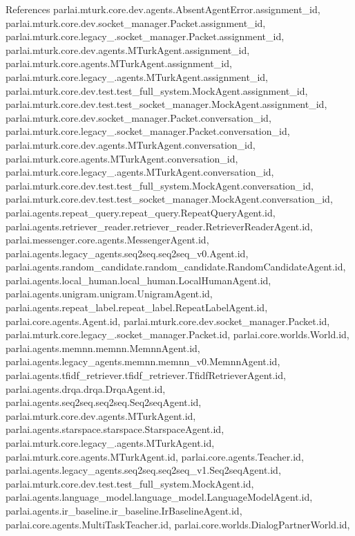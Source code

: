 References parlai.\+mturk.\+core.\+dev.\+agents.\+Absent\+Agent\+Error.\+assignment\+\_\+id, parlai.\+mturk.\+core.\+dev.\+socket\+\_\+manager.\+Packet.\+assignment\+\_\+id, parlai.\+mturk.\+core.\+legacy\+\_.\+socket\+\_\+manager.\+Packet.\+assignment\+\_\+id, parlai.\+mturk.\+core.\+dev.\+agents.\+M\+Turk\+Agent.\+assignment\+\_\+id, parlai.\+mturk.\+core.\+agents.\+M\+Turk\+Agent.\+assignment\+\_\+id, parlai.\+mturk.\+core.\+legacy\+\_.\+agents.\+M\+Turk\+Agent.\+assignment\+\_\+id, parlai.\+mturk.\+core.\+dev.\+test.\+test\+\_\+full\+\_\+system.\+Mock\+Agent.\+assignment\+\_\+id, parlai.\+mturk.\+core.\+dev.\+test.\+test\+\_\+socket\+\_\+manager.\+Mock\+Agent.\+assignment\+\_\+id, parlai.\+mturk.\+core.\+dev.\+socket\+\_\+manager.\+Packet.\+conversation\+\_\+id, parlai.\+mturk.\+core.\+legacy\+\_.\+socket\+\_\+manager.\+Packet.\+conversation\+\_\+id, parlai.\+mturk.\+core.\+dev.\+agents.\+M\+Turk\+Agent.\+conversation\+\_\+id, parlai.\+mturk.\+core.\+agents.\+M\+Turk\+Agent.\+conversation\+\_\+id, parlai.\+mturk.\+core.\+legacy\+\_.\+agents.\+M\+Turk\+Agent.\+conversation\+\_\+id, parlai.\+mturk.\+core.\+dev.\+test.\+test\+\_\+full\+\_\+system.\+Mock\+Agent.\+conversation\+\_\+id, parlai.\+mturk.\+core.\+dev.\+test.\+test\+\_\+socket\+\_\+manager.\+Mock\+Agent.\+conversation\+\_\+id, parlai.\+agents.\+repeat\+\_\+query.\+repeat\+\_\+query.\+Repeat\+Query\+Agent.\+id, parlai.\+agents.\+retriever\+\_\+reader.\+retriever\+\_\+reader.\+Retriever\+Reader\+Agent.\+id, parlai.\+messenger.\+core.\+agents.\+Messenger\+Agent.\+id, parlai.\+agents.\+legacy\+\_\+agents.\+seq2seq.\+seq2seq\+\_\+v0.\+Agent.\+id, parlai.\+agents.\+random\+\_\+candidate.\+random\+\_\+candidate.\+Random\+Candidate\+Agent.\+id, parlai.\+agents.\+local\+\_\+human.\+local\+\_\+human.\+Local\+Human\+Agent.\+id, parlai.\+agents.\+unigram.\+unigram.\+Unigram\+Agent.\+id, parlai.\+agents.\+repeat\+\_\+label.\+repeat\+\_\+label.\+Repeat\+Label\+Agent.\+id, parlai.\+core.\+agents.\+Agent.\+id, parlai.\+mturk.\+core.\+dev.\+socket\+\_\+manager.\+Packet.\+id, parlai.\+mturk.\+core.\+legacy\+\_.\+socket\+\_\+manager.\+Packet.\+id, parlai.\+core.\+worlds.\+World.\+id, parlai.\+agents.\+memnn.\+memnn.\+Memnn\+Agent.\+id, parlai.\+agents.\+legacy\+\_\+agents.\+memnn.\+memnn\+\_\+v0.\+Memnn\+Agent.\+id, parlai.\+agents.\+tfidf\+\_\+retriever.\+tfidf\+\_\+retriever.\+Tfidf\+Retriever\+Agent.\+id, parlai.\+agents.\+drqa.\+drqa.\+Drqa\+Agent.\+id, parlai.\+agents.\+seq2seq.\+seq2seq.\+Seq2seq\+Agent.\+id, parlai.\+mturk.\+core.\+dev.\+agents.\+M\+Turk\+Agent.\+id, parlai.\+agents.\+starspace.\+starspace.\+Starspace\+Agent.\+id, parlai.\+mturk.\+core.\+legacy\+\_.\+agents.\+M\+Turk\+Agent.\+id, parlai.\+mturk.\+core.\+agents.\+M\+Turk\+Agent.\+id, parlai.\+core.\+agents.\+Teacher.\+id, parlai.\+agents.\+legacy\+\_\+agents.\+seq2seq.\+seq2seq\+\_\+v1.\+Seq2seq\+Agent.\+id, parlai.\+mturk.\+core.\+dev.\+test.\+test\+\_\+full\+\_\+system.\+Mock\+Agent.\+id, parlai.\+agents.\+language\+\_\+model.\+language\+\_\+model.\+Language\+Model\+Agent.\+id, parlai.\+agents.\+ir\+\_\+baseline.\+ir\+\_\+baseline.\+Ir\+Baseline\+Agent.\+id, parlai.\+core.\+agents.\+Multi\+Task\+Teacher.\+id, parlai.\+core.\+worlds.\+Dialog\+Partner\+World.\+id, 